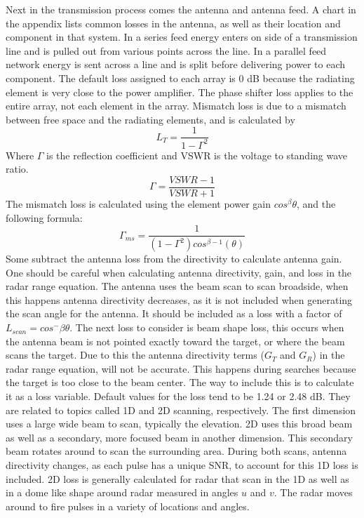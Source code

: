 \documentclass[12pt]{article}
\begin{document}
Next in the transmission process comes the antenna and antenna feed. A chart in the appendix lists common losses in the antenna, as well as their location and component in that system. In a series feed energy enters on side of a transmission line and is pulled out from various points across the line. In a parallel feed network energy is sent across a line and is split before delivering power to each component. The default loss assigned to each array is 0 dB because the radiating element is very close to the power amplifier. The phase shifter loss applies to the entire array, not each element in the array. Mismatch loss is due to a mismatch between free space and the radiating elements, and is calculated by 
\begin{equation}
    L_T = \frac{1}{1-\Gamma^2}
\end{equation}
Where $\Gamma$ is the reflection coefficient and VSWR is the voltage to standing wave ratio. 
\begin{equation}
    \Gamma = \frac{VSWR-1}{VSWR+1}
\end{equation}
The mismatch loss is calculated using the element power gain ${cos}^{\beta}\theta$, and the following formula:
\begin{equation}
    \Gamma_{ms} = \frac{1}{ (1-\Gamma^2) {cos}^{\beta-1} (\theta) }
\end{equation}
Some subtract the antenna loss from the directivity to calculate antenna gain. One should be careful when calculating antenna directivity, gain, and loss in the radar range equation. The antenna uses the beam scan to scan broadside, when this happens antenna directivity decreases, as it is not included when generating the scan angle for the antenna. It should be included as a loss with a factor of $ L_{scan} = {cos}^-\beta \theta$.
The next loss to consider is beam shape loss, this occurs when the antenna beam is not pointed exactly toward the target, or where the beam scans the target. Due to this the antenna directivity terms ($G_T$ and $G_R$) in the radar range equation, will not be accurate. This happens during searches because the target is too close to the beam center. The way to include this is to calculate it as a loss variable. Default values for the loss tend to be 1.24 or 2.48 dB. They are related to topics called 1D and 2D scanning, respectively. The first dimension uses a large wide beam to scan, typically the elevation. 2D uses this broad beam as well as a secondary, more focused beam in another dimension. This secondary beam rotates around to scan the surrounding area. During both scans, antenna directivity changes, as each pulse has a unique SNR, to account for this 1D loss is included. 2D loss is generally calculated for radar that scan in the 1D as well as in a dome like shape around radar measured in angles $u$ and $v$. The radar moves around to fire pulses in a variety of locations and angles.
\end{document}
